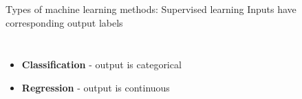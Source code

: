 \documentclass[pdf]{beamer}
\begin{document}
\begin{frame}{Types of machine learning methods: Supervised learning}
\vspace{0.5cm}
Inputs have corresponding output labels
\vspace{-0.5cm}
\begin{columns}
\begin{itemize}\addtolength{\itemsep}{6\baselineskip}
	\item<2-> \textbf{Classification} - output is categorical
	\item<3-> \textbf{Regression} - output is continuous
\end{itemize}
\begin{center}
	\vfill

\end{center}
\end{columns}
\end{frame}
\end{document}
